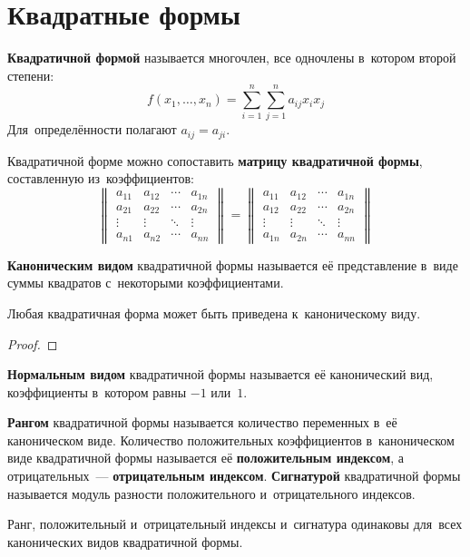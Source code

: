\section{Квадратные формы}
\textbf{Квадратичной формой} называется многочлен, все одночлены в~котором второй степени:
\begin{equation*}
f(x_1, \ldots, x_n) = \sum_{i=1}^n \sum_{j=1}^n a_{ij} x_i x_j
\end{equation*}
Для~определённости полагают $a_{ij} = a_{ji}$.

Квадратичной форме можно сопоставить \textbf{матрицу квадратичной формы}, составленную из~коэффициентов:
\begin{equation*}
\begin{Vmatrix}
a_{11} & a_{12} & \cdots & a_{1n} \\
a_{21} & a_{22} & \cdots & a_{2n} \\
\vdots & \vdots & \ddots & \vdots \\
a_{n1} & a_{n2} & \cdots & a_{nn}
\end{Vmatrix} =
\begin{Vmatrix}
a_{11} & a_{12} & \cdots & a_{1n} \\
a_{12} & a_{22} & \cdots & a_{2n} \\
\vdots & \vdots & \ddots & \vdots \\
a_{1n} & a_{2n} & \cdots & a_{nn}
\end{Vmatrix}
\end{equation*}

\textbf{Каноническим видом} квадратичной формы называется её представление в~виде суммы квадратов с~некоторыми коэффициентами.

\begin{theorem}
Любая квадратичная форма может быть приведена к~каноническому виду.
\end{theorem}
\begin{proof}

\end{proof}

\textbf{Нормальным видом} квадратичной формы называется её канонический вид, коэффициенты в~котором равны $-1$ или~$1$.

\textbf{Рангом} квадратичной формы называется количество переменных в~её каноническом виде.
Количество положительных коэффициентов в~каноническом виде квадратичной формы называется её \textbf{положительным индексом}, а отрицательных~--- \textbf{отрицательным индексом}.
\textbf{Сигнатурой} квадратичной формы называется модуль разности положительного и~отрицательного индексов.

Ранг, положительный и~отрицательный индексы и~сигнатура одинаковы для~всех канонических видов квадратичной формы.